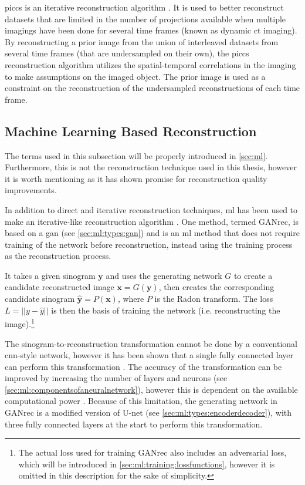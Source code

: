 \Gls{piccs} is an iterative reconstruction algorithm \cite{piccs}. It is used to better reconstruct datasets that are limited in the number of projections available when multiple imagings have been done for several time frames (known as dynamic \gls{ct} imaging). By reconstructing a prior image from the union of interleaved datasets from several time frames (that are undersampled on their own), the \gls{piccs} reconstruction algorithm utilizes the spatial-temporal correlations in the imaging to make assumptions on the imaged object. The prior image is used as a constraint on the reconstruction of the undersampled reconstructions of each time frame. 


\subsection{Machine Learning Based Reconstruction}
The terms used in this subsection will be properly introduced in \cref{sec:ml}. Furthermore, this is not the reconstruction technique used in this thesis, however it is worth mentioning as it has shown promise for reconstruction quality improvements. 

In addition to direct and iterative reconstruction techniques, \gls{ml} has been used to make an iterative-like reconstruction algorithm \cite{GANrec}. One method, termed GANrec, is based on a \gls{gan} (see \cref{sec:ml:types:gan}) and is an \gls{ml} method that does not require training of the network before reconstruction, instead using the training process as the reconstruction process. 

It takes a given sinogram $\bm{y}$ and uses the generating network $G$ to create a candidate reconstructed image $\bm{x} = G(\bm{y})$, then creates the corresponding candidate sinogram $\hat{\bm{y}} = P(\bm{x})$, where $P$ is the Radon transform. The loss $L = \left|\left| y - \hat{y} \right|\right|$ is then the basis of training the network (i.e. reconstructing the image).\footnote{The actual loss used for training GANrec also includes an adversarial loss, which will be introduced in \cref{sec:ml:training:lossfunctions}, however it is omitted in this description for the sake of simplicity. }

The sinogram-to-reconstruction transformation cannot be done by a conventional \gls{cnn}-style network, however it has been shown that a single fully connected layer can perform this transformation \cite{PASCHALIS2004211}. The accuracy of the transformation can be improved by increasing the number of layers and neurons (see \cref{sec:ml:componentsofaneuralnetwork}), however this is dependent on the available computational power \cite{GANrec}. Because of this limitation, the generating network in GANrec is a modified version of U-net \cite{unet} (see \cref{sec:ml:types:encoderdecoder}), with three fully connected layers at the start to perform this transformation. 
